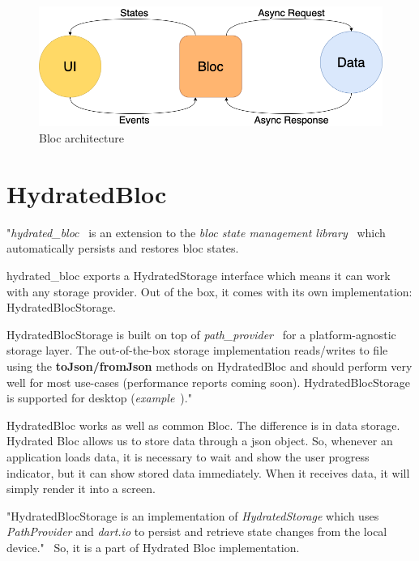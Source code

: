 \begin{figure}
    \centering
    \includegraphics[scale=0.4]{assets/bloc_architecture.png}
    \caption{Bloc architecture~\cite{bloc}}
    \label{fig:bloc-architecture}
\end{figure}

\section{HydratedBloc}\label{sec:hydratedbloc}
"\textit{hydrated\_bloc}~\cite{hydratedBlocPubDev} is an extension to the \textit{bloc state management library}~\cite{bloc} which automatically persists and restores bloc states.

hydrated\_bloc exports a HydratedStorage interface which means it can work with any storage provider.
Out of the box, it comes with its own implementation: HydratedBlocStorage.

HydratedBlocStorage is built on top of \textit{path\_provider}~\cite{pathProvider} for a platform-agnostic storage layer.
The out-of-the-box storage implementation reads/writes to file using the \textbf{toJson/fromJson} methods on HydratedBloc and should perform very well for most use-cases (performance reports coming soon).
HydratedBlocStorage is supported for desktop (\textit{example}~\cite{hydratedBlocExample})."~\cite{hydratedBlocTut}

HydratedBloc works as well as common Bloc.
The difference is in data storage.
Hydrated Bloc allows us to store data through a \acrshort{json} object.
So, whenever an application loads data, it is necessary to wait and show the user progress indicator, but it can show stored data immediately.
When it receives data, it will simply render it into a screen.

"HydratedBlocStorage is an implementation of \textit{HydratedStorage} which uses \textit{PathProvider} and \textit{dart.io} to persist and retrieve state changes from the local device."~\cite{hydratedBlocStorage}
So, it is a part of Hydrated Bloc implementation.
